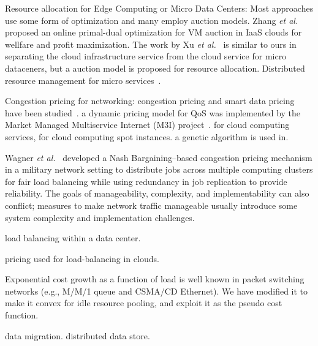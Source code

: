 
Resource allocation for Edge Computing or Micro Data Centers:
Most approaches use some form of optimization and many employ auction
models.
Zhang {\em et al.}~\cite{Xu2017-zenith,Zhang2017-VMauction}
proposed an online primal-dual optimization for VM auction in IaaS
clouds for wellfare and profit maximization.
The work by Xu {\em et al.}~\cite{Xu2017-zenith} is similar to ours in
separating the cloud infrastructure service from the cloud service for
micro dataceners, but a auction model is proposed for resource
allocation.
Distributed resource management for micro services~\cite{Suresh-SOA-SOCC2017}.

Congestion pricing for networking:
congestion pricing and smart data pricing have been
studied~\cite{pricing-internet-1994,Kelly-1998,gibbens1999resource,Henderson2001,Sen-2013}.
a dynamic pricing model for QoS was implemented by the
Market Managed Multiservice Internet (M3I) project~\cite{Briscoe2003-M3I}.
for cloud computing services\cite{Wang-hotcloud2010,Kilcioglu-SIGMETRICS2015},
for cloud computing spot instances\cite{Song-INFOCOM2017}.
a genetic algorithm is used in\cite{Macias-SAC2011}.

Wagner {\em et al.}~\cite{Wagner-2012} developed a Nash
Bargaining–based congestion pricing mechanism in a military network
setting to distribute jobs across multiple computing clusters for fair
load balancing while using redundancy in job replication to provide
reliability. The goals of manageability, complexity, and
implementability can also conflict; measures to make network traffic
manageable usually introduce some system complexity and implementation
challenges.

load balancing within a data center\cite{Rikhtegar2021BiTEAD}.

pricing used for load-balancing in clouds\cite{Song-2014,Ren-2017}.

Exponential cost growth as a function of load is well known in packet
switching networks (e.g., M/M/1 queue and CSMA/CD Ethernet).
We have modified it to make it convex for idle resource pooling, and
exploit it as the pseudo cost function.

data migration\cite{Pu2015-geodistdata}.
distributed data store\cite{Shima2012,Tahoe-2008}.


